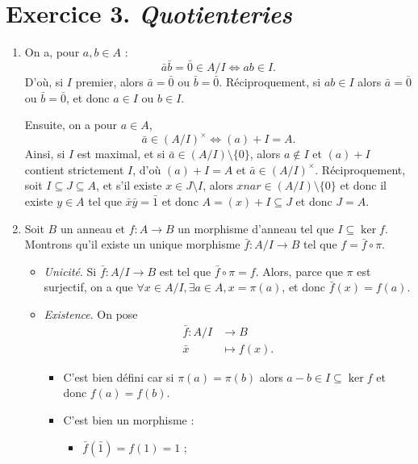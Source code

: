 \documentclass[./main]{subfiles}
\begin{document}
  \section{Exercice 3. \textit{Quotienteries}}

  \begin{enumerate}
    \item On a, pour $a, b \in A$ :
      \[
      \bar{a} \bar{b} = \bar{0} \in A / I \iff a b \in I
      .\]
      D'où, 
      si $I$ premier, alors $\bar{a} = \bar{0}$ ou $\bar{b} = \bar{0}$.
      Réciproquement, si $ab \in I$ alors $\bar{a} = \bar{0}$ ou $\bar{b} = \bar{0}$, et donc $a \in I$ ou $b \in I$.

      Ensuite, on a pour $a \in A$, \[
      \bar{a} \in (A / I)^\times \iff (a) + I = A
      .\] 
      Ainsi, si $I$ est maximal, et si  $\bar{a} \in (A / I) \setminus \{0\}$, alors $a\not\in I$ et $(a) + I$ contient strictement $I$, d'où $(a) + I = A$ et  $\bar{a} \in (A / I)^\times$.
      Réciproquement, soit $I \subseteq J \subseteq A$, et s'il existe $x \in J \setminus I$, alors $xnar \in (A / I) \setminus \{0\}$ et donc il existe $y \in A$ tel que $\bar{x} \bar{y} = \bar{1}$ et donc $A = (x) + I \subseteq J$ et donc $J = A$.
    \item Soit $B$ un anneau et $f : A \to B$ un morphisme d'anneau tel que $I \subseteq \ker f$.
      Montrons qu'il existe un unique morphisme $\bar{f} : A / I \to B$ tel que $f = \bar{f} \circ \pi$.
      \begin{itemize}
        \item \textit{Unicité}.
          Si $\bar{f} : A / I \to B$ est tel que $\bar{f} \circ \pi = f$.
          Alors, parce que $\pi$ est surjectif, on a que $\forall x \in A/I, \exists a \in A, x = \pi(a)$, et donc $\bar{f}(x) = f(a)$.
        \item \textit{Existence}.
          On pose \begin{align*}
            \bar{f}: A / I &\longrightarrow B \\
            \bar{x} &\longmapsto f(x)
          .\end{align*}
          \begin{itemize}
            \item C'est bien défini car si $\pi(a) = \pi(b)$ alors $a-b \in I \subseteq \ker f$ et donc $f(a) = f(b)$.
            \item C'est bien un morphisme :
               \begin{itemize}
                \item $\bar{f}(\bar{1}) = f(1) = 1$ ;

\end{itemize}
\end{itemize}
\end{itemize}
\end{enumerate}
\end{document}
